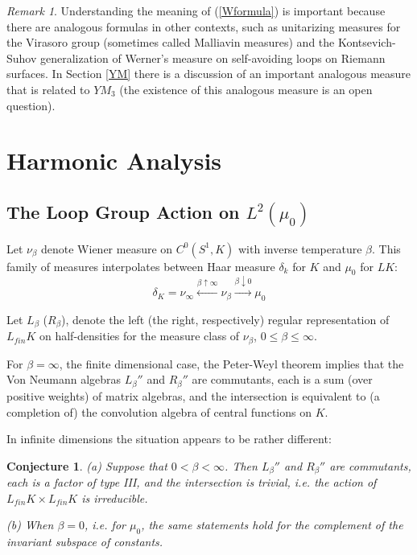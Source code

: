 \documentclass{amsart}
\theoremstyle{conjecture}
\newtheorem{conjecture}{Conjecture}
\theoremstyle{definition}
\theoremstyle{question}
\theoremstyle{questions}
\theoremstyle{remark}
\newtheorem*{remark}{Remark}
\theoremstyle{remarks}
\theoremstyle{example}
\numberwithin{equation}{section}
\begin{document}
\begin{remark}Understanding the meaning of (\ref{Wformula}) is important because there are analogous formulas
in other contexts, such as unitarizing measures for the Virasoro group (sometimes called Malliavin measures) and the Kontsevich-Suhov generalization of Werner's measure on self-avoiding loops on Riemann surfaces. In Section \ref{YM}
there is a discussion of an important analogous measure that is related to $YM_3$ (the existence of this analogous measure is an open question).
\end{remark}


\section{Harmonic Analysis}\label{representations}

\subsection{The Loop Group Action on $L^2(\mu_0)$}\label{loopgroupaction}

Let $\nu_{\beta}$ denote Wiener measure on $C^0(S^1,K)$ with inverse temperature
$\beta$. This family of measures interpolates between Haar measure $\delta_k$ for $K$ and $\mu_0$ for $LK$:
$$\delta_K=\nu_{\infty} \stackrel{\beta\uparrow \infty}{\leftarrow} \nu_{\beta} \stackrel{\beta\downarrow 0}{\rightarrow}\mu_0 $$

Let $L_{\beta}$ ($R_{\beta}$), denote the left (the right, respectively) regular representation of $L_{fin}K$ on half-densities for the measure
class of $\nu_{\beta}$, $0\le \beta\le \infty$.

For $\beta=\infty$, the finite dimensional case, the Peter-Weyl theorem implies that the Von Neumann algebras $L_{\beta}''$ and $R_{\beta}''$ are commutants, each is a sum (over positive weights) of matrix algebras, and the intersection is equivalent to (a completion of) the convolution algebra of central functions on $K$.

In infinite dimensions the situation appears to be rather different:

\begin{conjecture} (a) Suppose that $0<\beta<\infty$.  Then $L_{\beta}''$ and $R_{\beta}''$ are commutants,
each is a factor of type III, and the intersection is trivial, i.e. the action of $L_{fin}K \times L_{fin}K$
is irreducible.

(b) When $\beta=0$, i.e. for $\mu_0$, the same statements hold for the complement of the invariant subspace of constants.
\end{conjecture}
\end{document}
